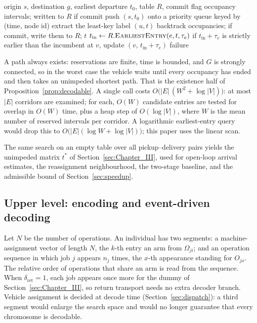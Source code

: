 \documentclass[manuscript,screen,review]{acmart}
\begin{document}
\begin{algorithm}[t]
  \caption{\textsc{Route}: conflict-free planning of a single leg}
  \label{alg:route}
  \footnotesize
  \begin{algorithmic}[1]
  \Require origin $s$, destination $g$, earliest departure $t_0$, table $R$, commit flag
  \Ensure occupancy intervals; written to $R$ if commit
  \State push $(s,t_0)$ onto a priority queue keyed by (time, node id)
    \State extract the least-key label $(u,t)$
      \State backtrack occupancies; if commit, write them to $R$; \Return $t$
    \EndIf
      \State $t_{\text{in}} \gets R.\textsc{EarliestEntry}(e,t,\tau_e)$
      \State if $t_{\text{in}}+\tau_e$ is strictly earlier than the incumbent at $v$, update $(v,\,t_{\text{in}}+\tau_e)$
    \EndFor
  \EndWhile
  \State \Return failure 
  \end{algorithmic}
\end{algorithm}

A path always exists: reservations are finite, time is bounded, and $G$ is strongly connected, so in the worst case the vehicle waits until every occupancy has ended and then takes an unimpeded shortest path.
That is the existence half of Proposition~\ref{prop:decodable}.
A single call costs $O\bigl(|E|\,(W^{2}+\log|V|)\bigr)$: at most $|E|$ corridors are examined; for each, $O(W)$ candidate entries are tested for overlap in $O(W)$ time, plus a heap step of $O(\log|V|)$, where $W$ is the mean number of reserved intervals per corridor.
A logarithmic earliest-entry query would drop this to $O\bigl(|E|(\log W+\log|V|)\bigr)$; this paper uses the linear scan.

The same search on an empty table over all pickup--delivery pairs yields the unimpeded matrix $t^{*}$ of Section~\ref{sec:Chapter_III}, used for open-loop arrival estimates, the reassignment neighbourhood, the two-stage baseline, and the admissible bound of Section~\ref{sec:speedup}.


\subsection{Upper level: encoding and event-driven decoding}
\label{sec:upper}

Let $N$ be the number of operations.
An individual has two segments: a machine-assignment vector of length $N$, the $k$-th entry an arm from $\Omega_{ji}$; and an operation sequence in which job $j$ appears $n_j$ times, the $x$-th appearance standing for $O_{jx}$.
The relative order of operations that share an arm is read from the sequence.
When $\delta_{\mathrm{ret}}=1$, each job appears once more for the dummy of Section~\ref{sec:Chapter_III}, so return transport needs no extra decoder branch.
Vehicle assignment is decided at decode time (Section~\ref{sec:dispatch}): a third segment would enlarge the search space and would no longer guarantee that every chromosome is decodable.
\end{document}

